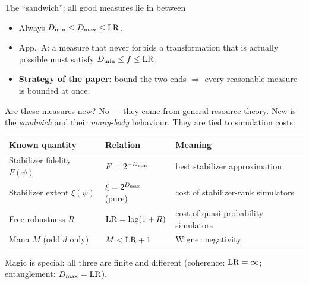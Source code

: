 \begin{frame}{The ``sandwich'': all good measures lie in between}
  \centering
  \vspace{0.5em}
  \begin{itemize}
    \item Always $D_{\min}\le D_{\max}\le\mathrm{LR}$.
    \item App.\ A: a measure that never forbids a transformation that is actually possible must satisfy $D_{\min}\le f\le\mathrm{LR}$.
    \item \textbf{Strategy of the paper:} bound the two ends $\Rightarrow$ every reasonable measure is bounded at once.
  \end{itemize}
\end{frame}

\begin{frame}{Are these measures new?}
  \small
  No --- they come from general resource theory. New is the \emph{sandwich} and their \emph{many-body} behaviour. They are tied to simulation costs:
  \vspace{0.3em}
  \begin{center}
  \begin{tabular}{@{}lll@{}}
    \toprule
    Known quantity & Relation & Meaning\\
    \midrule
    Stabilizer fidelity $F(\psi)$ & $F=2^{-D_{\min}}$ & best stabilizer approximation\\
    Stabilizer extent $\xi(\psi)$ & $\xi=2^{D_{\max}}$ (pure) & cost of stabilizer-rank simulators\\
    Free robustness $R$ & $\mathrm{LR}=\log(1+R)$ & cost of quasi-probability simulators\\
    Mana $M$ (odd $d$ only) & $M<\mathrm{LR}+1$ & Wigner negativity\\
    \bottomrule
  \end{tabular}
  \end{center}
  \vspace{0.3em}
  Magic is special: all three are finite and different (coherence: $\mathrm{LR}=\infty$; entanglement: $D_{\max}=\mathrm{LR}$).
\end{frame}

